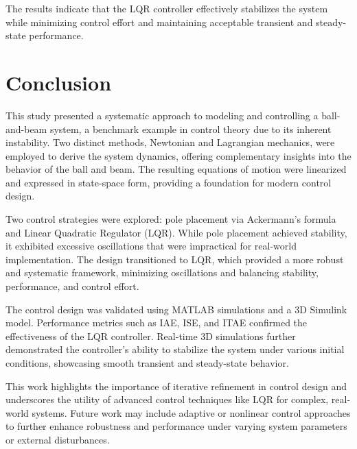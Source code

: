 \documentclass[conference]{IEEEtran}
\begin{document}
The results indicate that the LQR controller effectively stabilizes the system while minimizing control effort and maintaining acceptable transient and steady-state performance.

\section{Conclusion}
\label{sec:conclusion}

This study presented a systematic approach to modeling and controlling a ball-and-beam system, a benchmark example in control theory due to its inherent instability. Two distinct methods, Newtonian and Lagrangian mechanics, were employed to derive the system dynamics, offering complementary insights into the behavior of the ball and beam. The resulting equations of motion were linearized and expressed in state-space form, providing a foundation for modern control design.

Two control strategies were explored: pole placement via Ackermann’s formula and Linear Quadratic Regulator (LQR). While pole placement achieved stability, it exhibited excessive oscillations that were impractical for real-world implementation. The design transitioned to LQR, which provided a more robust and systematic framework, minimizing oscillations and balancing stability, performance, and control effort.

The control design was validated using MATLAB simulations and a 3D Simulink model. Performance metrics such as IAE, ISE, and ITAE confirmed the effectiveness of the LQR controller. Real-time 3D simulations further demonstrated the controller's ability to stabilize the system under various initial conditions, showcasing smooth transient and steady-state behavior.

This work highlights the importance of iterative refinement in control design and underscores the utility of advanced control techniques like LQR for complex, real-world systems. Future work may include adaptive or nonlinear control approaches to further enhance robustness and performance under varying system parameters or external disturbances. \cite{bolivar2014}




\end{document}
